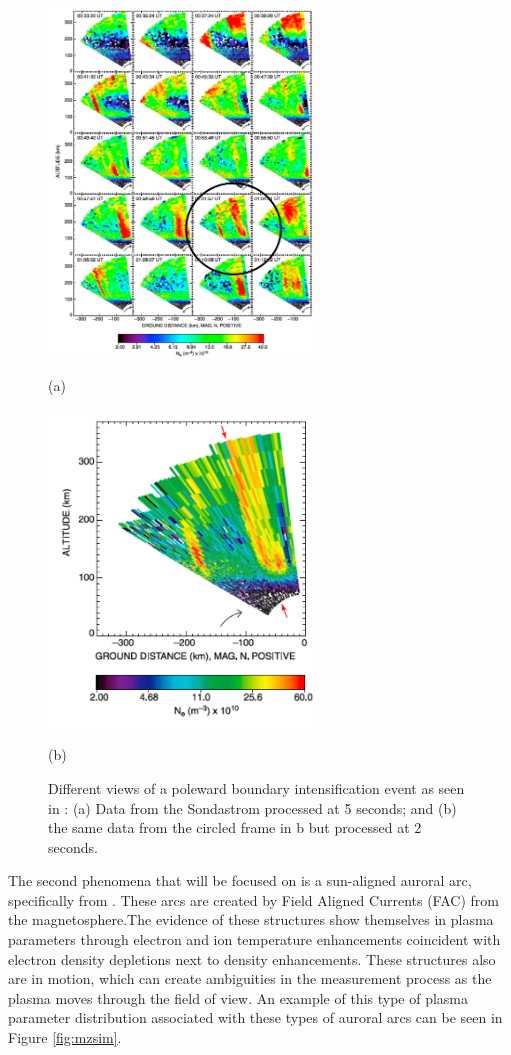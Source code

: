 \begin{figure}[htb]
  \begin{minipage}[t]{0.49\linewidth}\centering
    \includegraphics[width=7cm]{pbiall}
    \medskip
    \centerline{(a)}
  \end{minipage}\hfill
  \begin{minipage}[t]{0.49\linewidth}\centering
    \includegraphics[width=7cm]{pbifast}
    \medskip
    \centerline{(b)}
  \end{minipage}
  \caption{Different views of a poleward boundary intensification event as seen in \cite{Semeter:2005fo}: (a) Data from the Sondastrom processed at 5 seconds; and (b) the same data from the circled frame in b but processed at 2 seconds. }
  \label{fig:Sampling}
\end{figure}

The second phenomena that will be focused on is a sun-aligned auroral arc, specifically from \cite{Perry:2015jf}. These arcs are created by Field Aligned Currents (FAC) from the magnetosphere.The evidence of these structures show themselves in plasma parameters through electron and ion temperature enhancements coincident with electron density depletions next to density enhancements. These structures also are in motion, which can create ambiguities in the measurement process as the plasma moves through the field of view. An example of this type of plasma parameter distribution associated with these types of auroral arcs can be seen in Figure \ref{fig:mzsim}.

